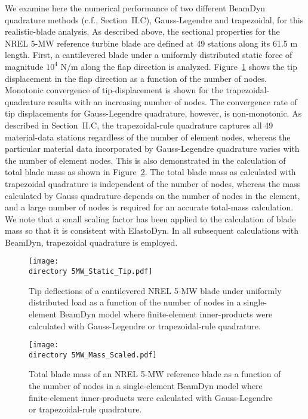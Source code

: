 \documentclass{aiaa-tc}
\def\directory{EPSF/}
\begin{document}
We examine here the numerical performance of two different BeamDyn quadrature methods (c.f., Section~II.C), Gauss-Legendre and trapezoidal, for this realistic-blade analysis.  
As described above, the sectional properties for the NREL 5-MW reference turbine blade are defined at 49 stations along its 61.5 m length.  
First, a cantilevered blade under a uniformly distributed static force of magnitude $10^4$ N/m along the flap direction is analyzed.
Figure~\ref{fig:5MWStaticTip} shows the tip displacement in the flap direction as a function of the number of nodes.  
Monotonic convergence of tip-displacement is shown for the trapezoidal-quadrature results with an increasing number of nodes.  
The convergence rate of tip displacements for Gauss-Legendre quadrature, however, is non-monotonic.  As described in Section~II.C, the trapezoidal-rule quadrature captures all 49 material-data stations regardless of the number of element nodes, whereas the particular material data incorporated by Gauss-Legendre quadrature varies with the number of element nodes.  
This is also demonstrated in the calculation of total blade mass as shown in Figure~\ref{fig:5MWMass}.  
The total blade mass as calculated with trapezoidal quadrature is independent of the number of nodes, whereas the mass calculated by Gauss quadrature  depends on the number of nodes in the
element, and a large number of nodes is required for an accurate total-mass
calculation.  
We note that a small scaling factor has been applied to the calculation of blade mass so that it is consistent with ElastoDyn.  
In all subsequent calculations with BeamDyn, trapezoidal quadrature is employed. 
\begin{figure}
\centering
\texttt{[image: \\directory 5MW\_Static\_Tip.pdf]}
\caption{Tip deflections of a cantilevered NREL 5-MW blade under uniformly distributed load as a function of the number of nodes in a single-element BeamDyn model where finite-element inner-products were calculated with Gauss-Legendre or trapezoidal-rule quadrature.} 
\label{fig:5MWStaticTip}
\end{figure}

\begin{figure}
    \centering
\texttt{[image: \\directory  5MW\_Mass\_Scaled.pdf]}
\caption{Total blade mass of an NREL 5-MW reference blade as a function of the number of nodes in a single-element BeamDyn model where finite-element inner-products were calculated with Gauss-Legendre or trapezoidal-rule quadrature.}
\label{fig:5MWMass}
\end{figure} 
\end{document}
